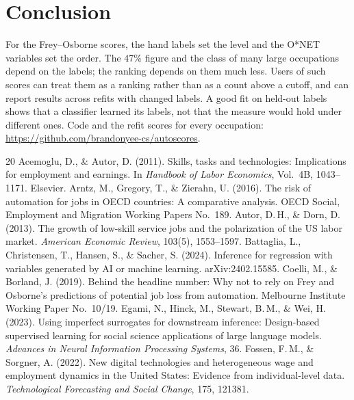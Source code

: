 \documentclass[11pt]{article}
\begin{document}
\section{Conclusion}
For the Frey--Osborne scores, the hand labels set the level and the O*NET variables set the order. The
47\% figure and the class of many large occupations depend on the labels; the ranking depends on them
much less. Users of such scores can treat them as a ranking rather than as a count above a cutoff, and
can report results across refits with changed labels. A good fit on held-out labels shows that a
classifier learned its labels, not that the measure would hold under different ones. Code and the refit
scores for every occupation: \url{https://github.com/brandonyee-cs/autoscores}.

\begingroup\footnotesize
\begin{thebibliography}{20}\setlength{\itemsep}{0pt}
 Acemoglu, D., \& Autor, D. (2011). Skills, tasks and
  technologies: Implications for employment and earnings. In \emph{Handbook of Labor Economics}, Vol.\ 4B,
  1043--1171. Elsevier.
 Arntz, M., Gregory, T., \& Zierahn, U. (2016). The risk of
  automation for jobs in OECD countries: A comparative analysis. OECD Social, Employment and Migration
  Working Papers No.\ 189.
 Autor, D.\,H., \& Dorn, D. (2013). The growth of low-skill
  service jobs and the polarization of the US labor market. \emph{American Economic Review}, 103(5),
  1553--1597.
 Battaglia, L., Christensen, T., Hansen, S., \& Sacher, S.
  (2024). Inference for regression with variables generated by AI or machine learning. arXiv:2402.15585.
 Coelli, M., \& Borland, J. (2019). Behind the headline
  number: Why not to rely on Frey and Osborne's predictions of potential job loss from automation.
  Melbourne Institute Working Paper No.\ 10/19.
 Egami, N., Hinck, M., Stewart, B.\,M., \& Wei, H. (2023). Using
  imperfect surrogates for downstream inference: Design-based supervised learning for social science
  applications of large language models. \emph{Advances in Neural Information Processing Systems}, 36.
 Fossen, F.\,M., \& Sorgner, A. (2022). New digital
  technologies and heterogeneous wage and employment dynamics in the United States: Evidence from
  individual-level data. \emph{Technological Forecasting and Social Change}, 175, 121381.

\end{thebibliography}
\end{document}
